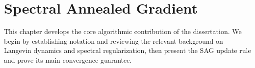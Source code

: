 \chapter{Spectral Annealed Gradient}

This chapter develops the core algorithmic contribution of the dissertation. We begin by establishing notation and reviewing the relevant background on Langevin dynamics and spectral regularization, then present the SAG update rule and prove its main convergence guarantee.
